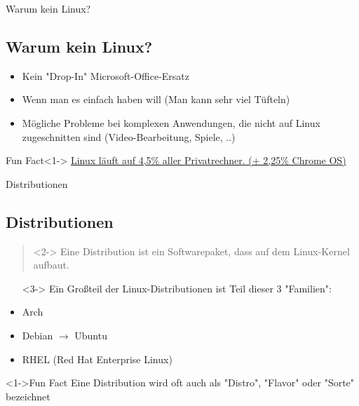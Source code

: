 \begin{frame}{Warum kein Linux?}
    \subsection{Warum kein Linux?}\label{subsec:warum-kein-linux?}

    \begin{itemize}
        \item<2-> Kein "Drop-In" Microsoft-Office-Ersatz
        \item<3-> Wenn man es einfach haben will (Man kann sehr viel Tüfteln)
        \item<4-> Mögliche Probleme bei komplexen Anwendungen, die nicht auf Linux zugeschnitten sind (Video-Bearbeitung, Spiele, ..)
    \end{itemize}

    \vspace{0.5cm}
    \begin{exampleblock}{Fun Fact}<1->
        \href{https://gs.statcounter.com/os-market-share/desktop/worldwide}{Linux läuft auf 4,5\% aller Privatrechner. (+ 2,25\% Chrome OS)}
    \end{exampleblock}

\end{frame}

\begin{frame}{Distributionen}
    \subsection{Distributionen}\label{subsec:distributionen}

    \begin{quote}<2->
        Eine Distribution ist ein Softwarepaket, dass auf dem Linux-Kernel aufbaut.
    \end{quote}

    \begin{itemize}
        \item[]<3-> Ein Großteil der Linux-Distributionen ist Teil dieser 3 "Familien":
    \end{itemize}

    \begin{itemize}
        \item<4-> Arch
        \item<5-> Debian $\longrightarrow$ Ubuntu
        \item<6-> RHEL (Red Hat Enterprise Linux)
    \end{itemize}

    \vspace{0.5cm}
    \begin{exampleblock}<1->{Fun Fact}
        Eine Distribution wird oft auch als "Distro", "Flavor" oder "Sorte" bezeichnet
    \end{exampleblock}

\end{frame}


